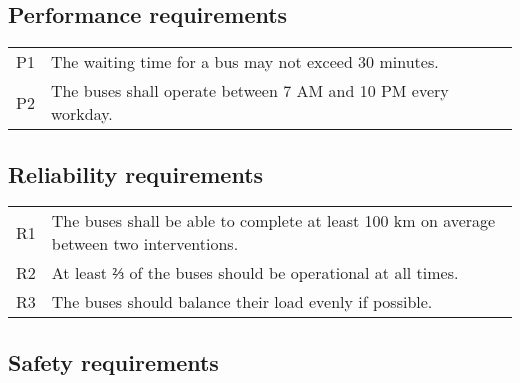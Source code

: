 \documentclass[a4paper]{article}
\begin{document}


\subsection{Performance requirements}

\begin{tabular}{l l}
        P1 & The waiting time for a bus may not exceed 30 minutes. \\
        P2 & The buses shall operate between 7 AM and 10 PM every workday. \\
\end{tabular}



\subsection{Reliability requirements}

\begin{tabular}{l l}
        R1 & The buses shall be able to complete at least 100 km on average between two interventions. \\
        R2 & At least ⅔ of the buses should be operational at all times. \\
        R3 & The buses should balance their load evenly if possible. \\
\end{tabular}



\subsection{Safety requirements}
\end{document}
